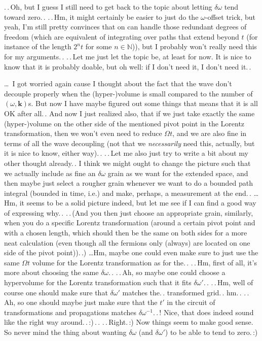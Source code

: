 \documentclass{report}
\begin{document}
.\,.\,Oh, but I guess I still need to get back to the topic about letting $\delta\omega$ tend toward zero.\,. .\,.\,Hm, it might certainly be easier to just do the $\omega$-offset trick, but yeah, I'm still pretty convinces that on can handle those redundant degrees of freedom (which are equivalent of integrating over paths that extend beyond $t$ (for instance of the length $2^n t$ for some $n\in\mathbb N$)), but I probably won't really need this for my arguments.\,. .\,.\,Let me just let the topic be, at least for now. It is nice to know that it is probably doable, but oh well: if I don't need it, I don't need it.\,. %

\ldots\ I got worried again cause I thought about the fact that the wave don't decouple properly when the (hyper-)volume is small compared to the number of $(\omega, \boldsymbol{k})$s. But now I have maybe figured out some things that means that it is all OK after all.\,. And now I just realized also, that if we just take exactly the same (hyper-)volume on the other side of the mentioned pivot point in the Lorentz transformation, then we won't even need to reduce $\Omega t$, and we are also fine in terms of all the wave decoupling (not that we \emph{necessarily} need this, actually, but it is nice to know, either way).\,. .\,.\,Let me also just try to write a bit about my other thought already.\,. I think we might ought to change the picture such that we actually include as fine an $\delta\omega$ grain as we want for the extended space, and then maybe just select a rougher grain whenever we want to do a bounded path integral (bounded in time, i.e.) and make, perhaps, a measurement at the end.\,. 
\ldots Hm, it seems to be a solid picture indeed, but let me see if I can find a good way of expressing why.\,. .\,.\,(And you then just choose an appropriate grain, similarly, when you do a specific Lorentz transformation (around a certain pivot point and with a chosen length, which should then be the same on both sides for a more neat calculation (even though all the fermions only (always) are located on one side of the pivot point)).\,.)
\ldots Hm, maybe one could even make sure to just use the same $\Omega t$ volume for the Lorentz transformation as for the.\,. .\,.\,Hm, first of all, it's more about choosing the same $\delta \omega$.\,. .\,.\,Ah, so maybe one could choose a hypervolume for the Lorentz transformation such that it fits $\delta\omega'$.\,. %
.\,.\,Hm, well of course one should make sure that $\delta\omega'$ matches the.\,. transformed grid.\,. hm.\,. .\,.\,Ah, so one should maybe just make sure that the $t'$ in the circuit of transformations and propagations matches $\delta\omega^{-1}$.\,.\,! Nice, that does indeed sound like the right way around.\,.\,:)\,.\,. %
.\,.\,Right.\,:) Now things seem to make good sense. So never mind the thing about wanting $\delta\omega$ (and $\delta\omega'$) to be able to tend to zero.\,:)
\end{document}
